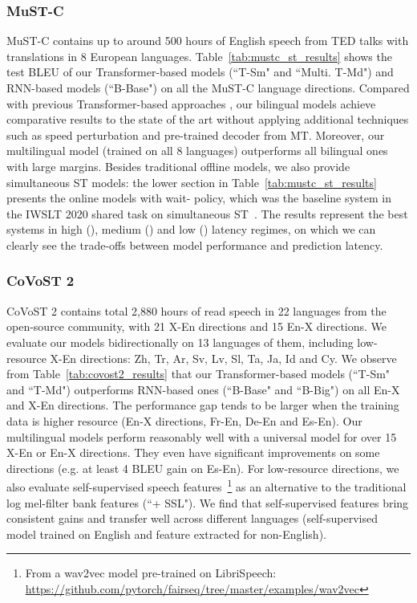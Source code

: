 \documentclass[11pt,a4paper]{article}
\begin{document}
\subsubsection{MuST-C}
MuST-C contains up to around 500 hours of English speech from TED talks with translations in 8 European languages.
Table~\ref{tab:mustc_st_results} shows the test BLEU of our Transformer-based models (``T-Sm" and ``Multi. T-Md") and RNN-based models (``B-Base") on all the MuST-C language directions.
Compared with previous Transformer-based approaches \cite{di-gangi-etal-2019-enhancing, inaguma-etal-2020-espnet}, our bilingual models achieve comparative results to the state of the art without applying additional techniques such as speed perturbation and pre-trained decoder from MT. Moreover, our multilingual model (trained on all 8 languages) outperforms all bilingual ones with large margins. Besides traditional offline models, we also provide simultaneous ST models: the lower section in Table~\ref{tab:mustc_st_results} presents the online models with wait- policy, which was the baseline system in the IWSLT 2020 shared task on simultaneous ST~\citep{ansari-etal-2020-findings}. 
The results represent the best systems in
high (), medium () and low () latency regimes, on which we can clearly see the trade-offs between model performance and prediction latency.


\subsubsection{CoVoST 2}
CoVoST 2 contains total 2,880 hours of read speech in 22 languages from the open-source community, with 21 X-En directions and 15 En-X directions. We evaluate our models bidirectionally on 13 languages of them, including low-resource X-En directions: Zh, Tr, Ar, Sv, Lv, Sl, Ta, Ja, Id and Cy. We observe from Table~\ref{tab:covost2_results} that our Transformer-based models (``T-Sm" and ``T-Md") outperforms RNN-based ones (``B-Base" and ``B-Big") on all En-X and X-En directions. The performance gap tends to be larger when the training data is higher resource (En-X directions, Fr-En, De-En and Es-En). Our multilingual models perform reasonably well with a universal model for over 15 X-En or En-X directions. They even have significant improvements on some directions (e.g. at least 4 BLEU gain on Es-En). For low-resource directions, we also evaluate self-supervised speech features~\citep{Schneider2019,wu2020selfsupervised}\footnote{From a wav2vec model pre-trained on LibriSpeech: \url{https://github.com/pytorch/fairseq/tree/master/examples/wav2vec}} as an alternative to the traditional log mel-filter bank features (``+ SSL"). We find that self-supervised features bring consistent gains and transfer well across different languages (self-supervised model trained on English and feature extracted for non-English).
\end{document}
